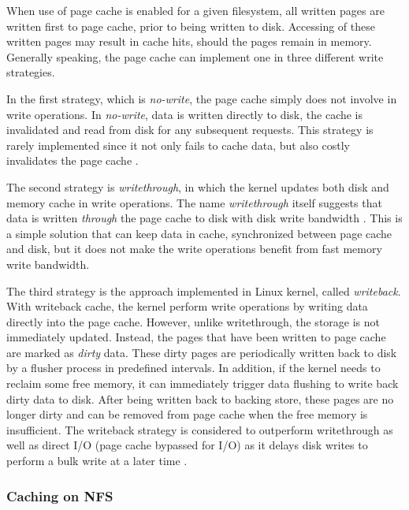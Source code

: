 When use of page cache is enabled for a given filesystem, all written pages 
are written first to page cache, prior to being written to disk.
Accessing of these written pages may result in cache hits, should the pages 
remain in memory.
Generally speaking, the page cache can implement one in three 
different write strategies.

In the first strategy, which is \textit{no-write}, the page cache simply does not 
involve in write operations. In \textit{no-write}, data is written directly to disk, 
the cache is invalidated and read from disk for any subsequent requests. 
This strategy is rarely implemented since it not only fails to cache data, 
but also costly invalidates the page cache \cite{linuxdev3rd2010}.

The second strategy is \textit{writethrough}, in which the kernel updates both 
disk and memory cache in write operations. The name \textit{writethrough} 
itself suggests that data is written \textit{through} the page cache to disk with 
disk write bandwidth \cite{linuxdev3rd2010}.
This is a simple solution that can keep data in cache, synchronized between 
page cache and disk, but it does not make the write operations benefit from 
fast memory write bandwidth. 

The third strategy is the approach implemented in Linux kernel, 
called \textit{writeback}. 
With writeback cache, the kernel perform write operations by writing data directly 
into the page cache. However, unlike writethrough, the storage is not immediately 
updated. Instead, the pages that have been written to page cache are marked 
as \textit{dirty} data. These dirty pages are periodically written back to disk by 
a flusher process in predefined intervals. 
In addition, if the kernel needs to reclaim some free memory, it can immediately 
trigger data flushing to write back dirty data to disk. 
After being written back to backing store, these pages are no longer dirty and 
can be removed from page cache when the free memory is insufficient.
The writeback strategy is considered to outperform writethrough as well as
direct I/O (page cache bypassed for I/O) as it delays disk writes to perform 
a bulk write at a later time \cite{linuxdev3rd2010}.

\subsubsection{Caching on NFS}


